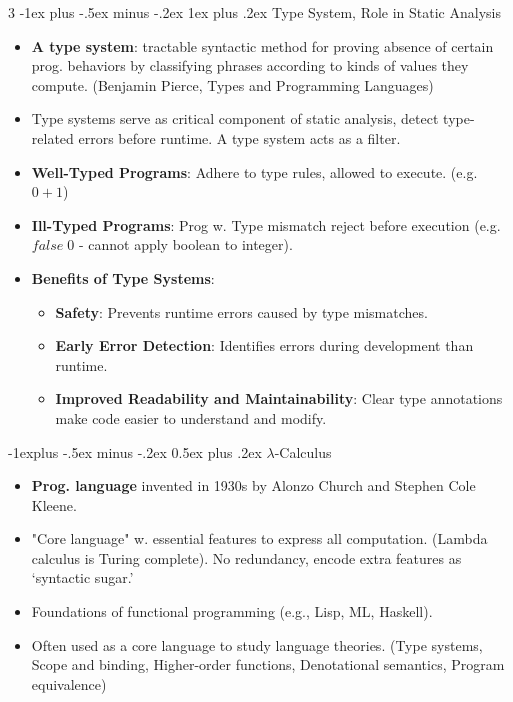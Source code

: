 \documentclass[a4paper, 10pt, landscape]{article}
\makeatletter
\renewcommand{\subsection}{\@startsection{subsection}{2}{0mm}%
                                {-1explus -.5ex minus -.2ex}%
                                {0.5ex plus .2ex}%
                                {\normalfont\normalsize\bfseries}}
\renewcommand{\subsubsection}{\@startsection{subsubsection}{3}{0mm}%
                                {-1ex plus -.5ex minus -.2ex}%
                                {1ex plus .2ex}%
                                {\normalfont\small\bfseries}}
\makeatother
\begin{document}
\begin{multicols*}{3}
\subsubsection{Type System, Role in Static Analysis}
\begin{itemize}
\item \textbf{A type system}: tractable syntactic method for proving absence of certain prog. behaviors by classifying phrases according to kinds of values they compute. (Benjamin Pierce, Types and Programming Languages)
\item Type systems serve as critical component of static analysis, detect type-related errors before runtime. A type system acts as a filter.
\item\textbf{Well-Typed Programs}: Adhere to type rules, allowed to execute. (e.g. $0 + 1$)
\item \textbf{Ill-Typed Programs}: Prog w. Type mismatch reject before execution (e.g. $false \; 0$ - cannot apply boolean to integer).
\item \textbf{Benefits of Type Systems}: 
	\begin{itemize}
	\item \textbf{Safety}: Prevents runtime errors caused by type mismatches.
	\item \textbf{Early Error Detection}: Identifies errors during development than runtime.
	\item \textbf{Improved Readability and Maintainability}: Clear type annotations make code easier to understand and modify.
	\end{itemize}
\end{itemize}

\subsection{$\lambda$-Calculus}
\begin{itemize}
\item \textbf{Prog. language} invented in 1930s by Alonzo Church and Stephen Cole Kleene.
\item "Core language" w. essential features to express all computation. (Lambda calculus is Turing complete). No redundancy, encode extra features as `syntactic sugar.'
\item Foundations of functional programming (e.g., Lisp, ML, Haskell).
\item Often used as a core language to study language theories. (Type systems, Scope and binding, Higher-order functions, Denotational semantics, Program equivalence)
\end{itemize}
    


\end{multicols*}
\end{document}

